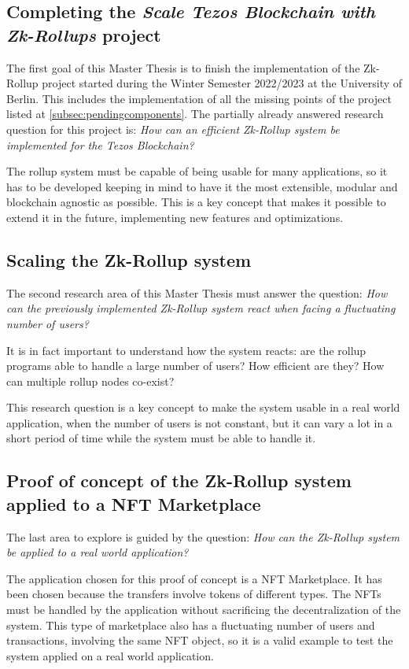 \subsection{Completing the \textit{Scale Tezos Blockchain with Zk-Rollups} project}
The first goal of this Master Thesis is to finish the implementation of the Zk-Rollup project started during the Winter Semester 2022/2023 at the University of Berlin. This includes the implementation of all the missing points of the project listed at \ref{subsec:pendingcomponents}. The partially already answered research question for this project is: \textit{How can an efficient Zk-Rollup system be implemented for the Tezos Blockchain?}

The rollup system must be capable of being usable for many applications, so it has to be developed keeping in mind to have it the most extensible, modular and blockchain agnostic as possible. This is a key concept that makes it possible to extend it in the future, implementing new features and optimizations.

\subsection{Scaling the Zk-Rollup system}
The second research area of this Master Thesis must answer the question: \textit{How can the previously implemented  Zk-Rollup system react when facing a fluctuating number of users?}

It is in fact important to understand how the system reacts: are the rollup programs able to handle a large number of users? How efficient are they? How can multiple rollup nodes co-exist?

This research question is a key concept to make the system usable in a real world application, when the number of users is not constant, but it can vary a lot in a short period of time while the system must be able to handle it.

\subsection{Proof of concept of the Zk-Rollup system applied to a NFT Marketplace}
The last area to explore is guided by the question: \textit{How can the Zk-Rollup system be applied to a real world application?}

The application chosen for this proof of concept is a NFT Marketplace. It has been chosen because the transfers involve tokens of different types. The NFTs must be handled by the application without sacrificing the decentralization of the system. This type of marketplace also has a fluctuating number of users and transactions, involving the same NFT object, so it is a valid example to test the system applied on a real world application.

